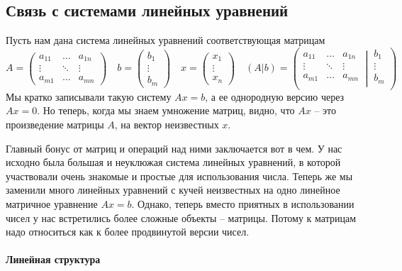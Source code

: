 \subsection{Связь с системами линейных уравнений}

Пусть нам дана система линейных уравнений соответствующая матрицам
\[
A= 
\begin{pmatrix}
a_{11}&\ldots& a_{1n}\\
\vdots&\ddots&\vdots\\
a_{m1}& \ldots &a_{mn}
\end{pmatrix}\quad
b = 
\begin{pmatrix}
b_1\\
\vdots\\
b_m
\end{pmatrix} \quad
x =
\begin{pmatrix}
x_1\\
\vdots\\
x_n
\end{pmatrix}\quad
(A|b) =
\left(\left.
\begin{matrix}
a_{11}&\ldots&a_{1n}\\
\vdots&\ddots&\vdots\\
a_{m1}&\ldots&a_{mn}\\
\end{matrix}
\:\right|\:
\begin{matrix}
b_1\\
\vdots\\
b_m\\
\end{matrix}\right)
\]
Мы кратко записывали такую систему $Ax = b$, а ее однородную версию через $Ax = 0$.
Но теперь, когда мы знаем умножение матриц, видно, что $Ax$ -- это произведение матрицы $A$, на вектор неизвестных $x$.

Главный бонус от матриц и операций над ними заключается вот в чем.
У нас исходно была большая и неуклюжая система линейных уравнений, в которой участвовали очень знакомые и простые для использования числа.
Теперь же мы заменили много линейных уравнений с кучей неизвестных на одно линейное матричное уравнение $Ax = b$.
Однако, теперь вместо приятных в использовании чисел у нас встретились более сложные объекты -- матрицы.
Потому к матрицам надо относиться как к более продвинутой версии чисел.

\paragraph{Линейная структура}

